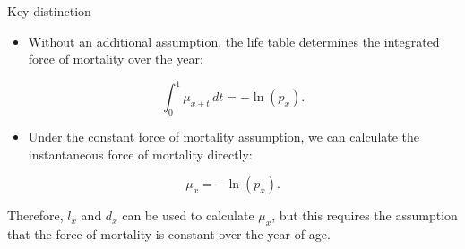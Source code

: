 \documentclass[
  ignorenonframetext,
  aspectratio=169,
]{beamer}
\providecommand{\tightlist}{%
  \setlength{\itemsep}{0pt}\setlength{\parskip}{0pt}}
\begin{document}
\begin{frame}{Key distinction}
\protect{}\label{key-distinction}
\begin{itemize}
\tightlist
\item
  Without an additional assumption, the life table determines the
  integrated force of mortality over the year:
\end{itemize}

\[
\int_0^1\mu_{x+t}\,dt=-\ln(p_x).
\]

\begin{itemize}
\tightlist
\item
  Under the constant force of mortality assumption, we can calculate the
  instantaneous force of mortality directly:
\end{itemize}

\[
\mu_x=-\ln(p_x).
\]

Therefore, \(l_x\) and \(d_x\) can be used to calculate \(\mu_x\), but
this requires the assumption that the force of mortality is constant
over the year of age.
\end{frame}
\end{document}
